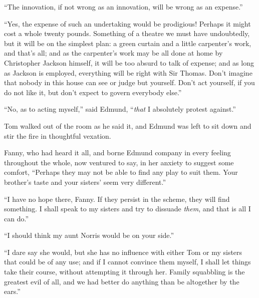 \documentclass{article}
\begin{document}
``The innovation, if not wrong as an innovation, will be
wrong as an expense.''

``Yes, the expense of such an undertaking would be prodigious!
Perhaps it might cost a whole twenty pounds.  Something of
a theatre we must have undoubtedly, but it will be on the
simplest plan:  a green curtain and a little carpenter's work,
and that's all; and as the carpenter's work may be all
done at home by Christopher Jackson himself, it will be
too absurd to talk of expense; and as long as Jackson
is employed, everything will be right with Sir Thomas.
Don't imagine that nobody in this house can see or judge
but yourself.  Don't act yourself, if you do not like it,
but don't expect to govern everybody else.''

``No, as to acting myself,'' said Edmund, ``\emph{that} I
absolutely protest against.''

Tom walked out of the room as he said it, and Edmund was
left to sit down and stir the fire in thoughtful vexation.

Fanny, who had heard it all, and borne Edmund company
in every feeling throughout the whole, now ventured to say,
in her anxiety to suggest some comfort, ``Perhaps they may
not be able to find any play to suit them.  Your brother's
taste and your sisters' seem very different.''

``I have no hope there, Fanny.  If they persist in the scheme,
they will find something.  I shall speak to my sisters
and try to dissuade \emph{them}, and that is all I can do.''

``I should think my aunt Norris would be on your side.''

``I dare say she would, but she has no influence with
either Tom or my sisters that could be of any use;
and if I cannot convince them myself, I shall let things
take their course, without attempting it through her.
Family squabbling is the greatest evil of all, and we had
better do anything than be altogether by the ears.''
\end{document}
